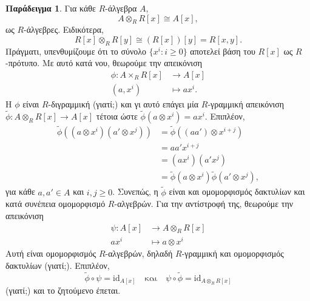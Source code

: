 \documentclass[12pt,a4paper,reqno]{amsart}
\theoremstyle{definition}
\newtheorem{example}[theorem]{Παράδειγμα}
\theoremstyle{remark}
\numberwithin{theorem}{section}
\numberwithin{exercise}{section}
\numberwithin{equation}{section}
\renewcommand{\to}{\rightarrow}
\newcommand{\rmid}{\mathrm{id}}
\begin{document}
\begin{example}
    \label{ex:tensorProduct_algebras}
    Για κάθε $R$-άλγεβρα $A$, 
    \[
    A \otimes_R R[x] \cong A[x],
    \]
    ως $R$-άλγεβρες. Ειδικότερα, 
    \[
    R[x] \otimes_R R[y] \cong \left(
        R[x]
    \right)[y] = R[x,y].
    \]
    Πράγματι, υπενθυμίζουμε ότι το σύνολο $\{x^i : i \ge 0\}$ αποτελεί βάση του $R[x]$ ως $R$-πρότυπο. Με αυτό κατά νου, θεωρούμε την απεικόνιση 
    \begin{align*}
        \phi : A \times_R R[x] &\to A[x] \\
        (a, x^i) &\mapsto ax^i.
    \end{align*}
    Η $\phi$ είναι $R$-διγραμμική (γιατί;) και γι αυτό επάγει μία $R$-γραμμική απεικόνιση $\tilde{\phi} : A \otimes_R R[x] \to A[x]$ τέτοια ώστε $\tilde{\phi}(a \otimes x^i) = ax^i$. Επιπλέον,
    \begin{align*}
    \tilde{\phi}\left(
        \left(
            a \otimes x^i
        \right)\left(
            a' \otimes x^j
        \right)
    \right) &= \tilde{\phi}\left(
        (aa') \otimes x^{i+j}
    \right) \\
    &= aa'x^{i+j} \\
    &= (ax^i)(a'x^j) \\
    &= \tilde{\phi}(a\otimes x^i)\tilde{\phi}(a' \otimes x^j),
    \end{align*}
    για κάθε $a, a' \in A$ και $i, j \ge 0$. Συνεπώς, η $\tilde{\phi}$ είναι και ομομορφισμός δακτυλίων και κατά συνέπεια ομομορφισμό $R$-αλγεβρών. Για την αντίστροφή της, θεωρούμε την απεικόνιση 
    \begin{align*}
        \psi : A[x] &\to A \otimes_R R[x] \\
            ax^i &\mapsto a \otimes x^i
    \end{align*}
    Αυτή είναι ομομορφισμός $R$-αλγεβρών, δηλαδή $R$-γραμμική και ομομορφισμός δακτυλίων (γιατί;). Επιπλέον,
    \[
        \tilde{\phi}\circ\psi = \rmid_{A[x]} \quad \text{και} \quad 
        \psi\circ\tilde{\phi} = \rmid_{A \otimes_R R[x]}
    \]
    (γιατί;) και το ζητούμενο έπεται.
\end{example}


\end{document}
